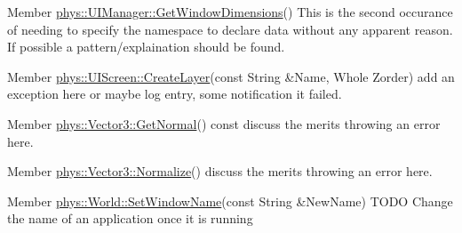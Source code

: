 \label{dd/da0/todo__todo000030}
\hypertarget{dd/da0/todo__todo000030}{}
 
\begin{DoxyDescription}
\item[Member \hyperlink{classphys_1_1UIManager_ae56846a64d8ce312aa36a749d15619df}{phys::UIManager::GetWindowDimensions}() ]This is the second occurance of needing to specify the namespace to declare data without any apparent reason. If possible a pattern/explaination should be found. 
\end{DoxyDescription}

\label{dd/da0/todo__todo000031}
\hypertarget{dd/da0/todo__todo000031}{}
 
\begin{DoxyDescription}
\item[Member \hyperlink{classphys_1_1UIScreen_a14c3256bda81d40553ff065993fcbe77}{phys::UIScreen::CreateLayer}(const String \&Name, Whole Zorder) ]add an exception here or maybe log entry, some notification it failed. 
\end{DoxyDescription}

\label{dd/da0/todo__todo000033}
\hypertarget{dd/da0/todo__todo000033}{}
 
\begin{DoxyDescription}
\item[Member \hyperlink{classphys_1_1Vector3_a81e11f45378758391c97ec55b519951c}{phys::Vector3::GetNormal}() const  ]discuss the merits throwing an error here. 
\end{DoxyDescription}

\label{dd/da0/todo__todo000032}
\hypertarget{dd/da0/todo__todo000032}{}
 
\begin{DoxyDescription}
\item[Member \hyperlink{classphys_1_1Vector3_ae39fe0545df88148bcd668b3bd2a4388}{phys::Vector3::Normalize}() ]discuss the merits throwing an error here. 
\end{DoxyDescription}

\label{dd/da0/todo__todo000037}
\hypertarget{dd/da0/todo__todo000037}{}
 
\begin{DoxyDescription}
\item[Member \hyperlink{classphys_1_1World_acd0dff342c08fe3008226488b7c53d97}{phys::World::SetWindowName}(const String \&NewName) ]TODO Change the name of an application once it is running 
\end{DoxyDescription}

